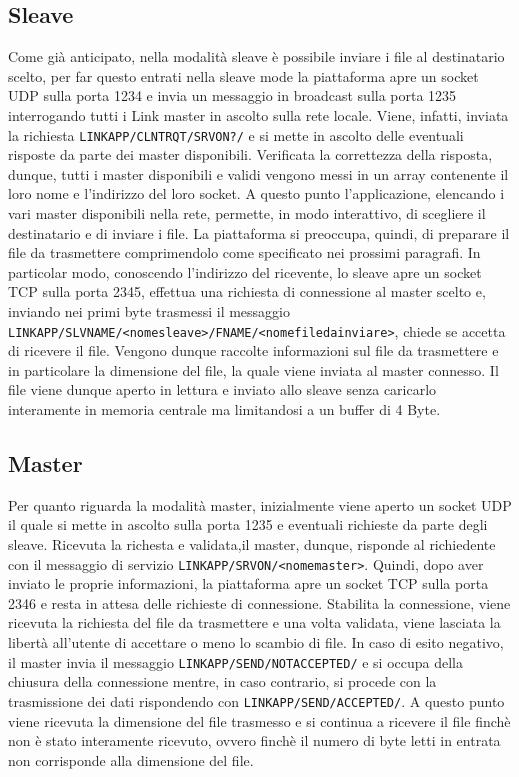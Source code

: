 \documentclass[11pt,fleqn]{book} %
\begin{document}
\subsection{Sleave}
Come già anticipato, nella modalità sleave è possibile inviare i file al destinatario scelto, per far questo entrati nella sleave mode la piattaforma apre un socket UDP sulla porta 1234 e invia un messaggio in broadcast sulla porta 1235 interrogando tutti i Link master in ascolto sulla rete locale.
Viene, infatti, inviata la richiesta \texttt{LINKAPP/CLNTRQT/SRVON?/} e si mette in ascolto delle eventuali risposte da parte dei master disponibili.
Verificata la correttezza della risposta, dunque, tutti i master disponibili e validi vengono messi in un array contenente il loro nome e l'indirizzo del loro socket.
A questo punto l'applicazione, elencando i vari master disponibili nella rete, permette, in modo interattivo, di scegliere il destinatario e di inviare i file.
La piattaforma si preoccupa, quindi, di preparare il file da trasmettere comprimendolo come specificato nei prossimi paragrafi.
In particolar modo, conoscendo l'indirizzo del ricevente, lo sleave apre un socket TCP sulla porta 2345, effettua una richiesta di connessione al master scelto e, inviando nei primi byte trasmessi il messaggio \texttt{LINKAPP/SLVNAME/<nomesleave>/FNAME/<nomefiledainviare>}, chiede se accetta di ricevere il file.
Vengono dunque raccolte informazioni sul file da trasmettere e in particolare la dimensione del file, la quale viene inviata al master connesso.
Il file viene dunque aperto in lettura e inviato allo sleave senza caricarlo interamente in memoria centrale ma limitandosi a un buffer di 4 Byte.

\subsection{Master}
Per quanto riguarda la modalità master, inizialmente viene aperto un socket UDP il quale si mette in ascolto sulla porta 1235 e eventuali richieste da parte degli sleave. Ricevuta la richesta e validata,il master, dunque, risponde al richiedente con il messaggio di servizio \texttt{LINKAPP/SRVON/<nomemaster>}.
Quindi, dopo aver inviato le proprie informazioni, la piattaforma apre un socket TCP sulla porta 2346 e resta in attesa delle richieste di connessione.
Stabilita la connessione, viene ricevuta la richiesta del file da trasmettere e una volta validata, viene lasciata la libertà all'utente di accettare o meno lo scambio di file. In caso di esito negativo, il master invia il messaggio  \texttt{LINKAPP/SEND/NOTACCEPTED/} e si occupa della chiusura della connessione mentre, in caso contrario, si procede con la trasmissione dei dati rispondendo con \texttt{LINKAPP/SEND/ACCEPTED/}.
A questo punto viene ricevuta la dimensione del file trasmesso e si continua a ricevere il file finchè non è stato interamente ricevuto, ovvero finchè il numero di byte letti in entrata non corrisponde alla dimensione del file.
\end{document}
